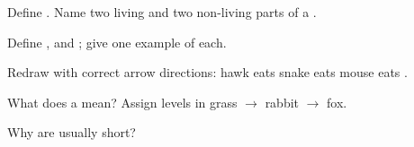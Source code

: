 \begin{exercise}[$\star$]\label{exo:g7:eco-energy:1}
Define . Name two living and two non-living parts of a 
.
\end{exercise}

\begin{exercise}[$\star$]\label{exo:g7:eco-energy:2}
Define ,  and ; give one example of each.
\end{exercise}

\begin{exercise}[$\star$]\label{exo:g7:eco-energy:3}
Redraw with correct arrow directions: hawk eats snake eats mouse eats
.
\end{exercise}

\begin{exercise}[$\star$]\label{exo:g7:eco-energy:4}
What does a  mean? Assign levels in grass $\to$ rabbit $\to$
fox.
\end{exercise}

\begin{exercise}[$\star$]\label{exo:g7:eco-energy:5}
Why are  usually short?
\end{exercise}

